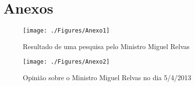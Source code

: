 \newpage
\hspace{1pt}
\newpage

\section{Anexos}

\hspace{1pt}

\begin{figure}[ht!]
\centering
\texttt{[image: ./Figures/Anexo1]}
\caption{Resultado de uma pesquisa pelo Ministro Miguel Relvas}
\label{fig:Anexo1}
\end{figure}


\newpage
\hspace{1pt}
\newpage


\begin{figure}[ht!]
\centering
\texttt{[image: ./Figures/Anexo2]}
\caption{Opinião sobre o Ministro Miguel Relvas no dia 5/4/2013}
\label{fig:Anexo2}
\end{figure}

